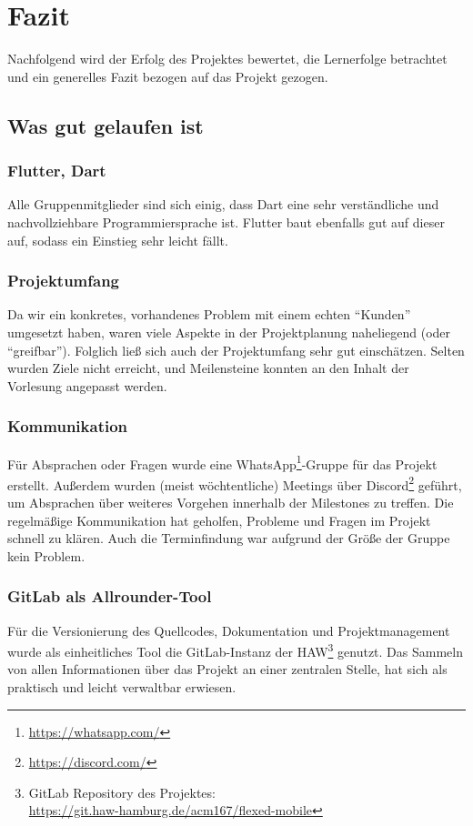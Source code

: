 \documentclass[
  a4paper,
  DIV=10,
  oneside,
  BCOR=5mm,
  parskip=half,
  numbers=noenddot
]{scrreprt}
\begin{document}
\chapter{Fazit}
Nachfolgend wird der Erfolg des Projektes bewertet, die Lernerfolge betrachtet und ein generelles Fazit bezogen auf das Projekt gezogen.

\section{Was gut gelaufen ist}
\subsection{Flutter, Dart}
Alle Gruppenmitglieder sind sich einig, dass Dart eine sehr verständliche und nachvollziehbare Programmiersprache ist. Flutter baut ebenfalls gut auf dieser auf, sodass ein Einstieg sehr leicht fällt. 

\subsection{Projektumfang}
Da wir ein konkretes, vorhandenes Problem mit einem echten ``Kunden'' umgesetzt haben, waren viele Aspekte in der Projektplanung naheliegend (oder ``greifbar''). Folglich ließ sich auch der Projektumfang sehr gut einschätzen. Selten wurden Ziele nicht erreicht, und Meilensteine konnten an den Inhalt der Vorlesung angepasst werden.

\subsection{Kommunikation}
Für Absprachen oder Fragen wurde eine WhatsApp\footnote{\url{https://whatsapp.com/}}-Gruppe für das Projekt erstellt. Außerdem wurden (meist wöchtentliche) Meetings über Discord\footnote{\url{https://discord.com/}} geführt, um Absprachen über weiteres Vorgehen innerhalb der Milestones zu treffen. Die regelmäßige Kommunikation hat geholfen, Probleme und Fragen im Projekt schnell zu klären. Auch die Terminfindung war aufgrund der Größe der Gruppe kein Problem.


\subsection{GitLab als Allrounder-Tool}
Für die Versionierung des Quellcodes, Dokumentation und Projektmanagement wurde als einheitliches Tool die GitLab-Instanz der HAW\footnote{GitLab Repository des Projektes:\\\url{https://git.haw-hamburg.de/acm167/flexed-mobile}} genutzt. Das Sammeln von allen Informationen über das Projekt an einer zentralen Stelle, hat sich als praktisch und leicht verwaltbar erwiesen.
\end{document}
